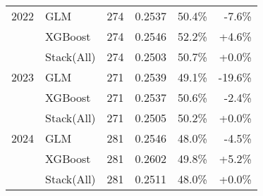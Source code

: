 \begin{table}[t]
\begin{tabular}{@{} c l r r r r @{} }
    \midrule
    2022 & GLM & 274 & 0.2537 & 50.4\% & -7.6\% \\
     & XGBoost & 274 & 0.2546 & 52.2\% & +4.6\% \\
     & Stack(All) & 274 & 0.2503 & 50.7\% & +0.0\% \\
    \midrule
    2023 & GLM & 271 & 0.2539 & 49.1\% & -19.6\% \\
     & XGBoost & 271 & 0.2537 & 50.6\% & -2.4\% \\
     & Stack(All) & 271 & 0.2505 & 50.2\% & +0.0\% \\
    \midrule
    2024 & GLM & 281 & 0.2546 & 48.0\% & -4.5\% \\
     & XGBoost & 281 & 0.2602 & 49.8\% & +5.2\% \\
     & Stack(All) & 281 & 0.2511 & 48.0\% & +0.0\% \\
    \bottomrule
  \end{tabular}
\end{table}
